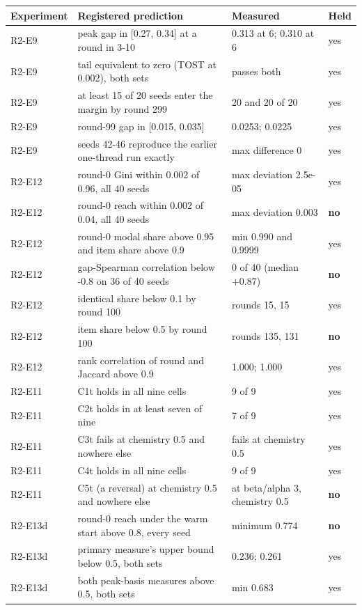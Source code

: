 \footnotesize
\begin{tabular}{lp{6.2cm}p{4.4cm}l}
\hline
Experiment & Registered prediction & Measured & Held \\
\hline
R2-E9 & peak gap in [0.27, 0.34] at a round in 3-10 & 0.313 at 6; 0.310 at 6 & yes \\
R2-E9 & tail equivalent to zero (TOST at 0.002), both sets & passes both & yes \\
R2-E9 & at least 15 of 20 seeds enter the margin by round 299 & 20 and 20 of 20 & yes \\
R2-E9 & round-99 gap in [0.015, 0.035] & 0.0253; 0.0225 & yes \\
R2-E9 & seeds 42-46 reproduce the earlier one-thread run exactly & max difference 0 & yes \\
R2-E12 & round-0 Gini within 0.002 of 0.96, all 40 seeds & max deviation 2.5e-05 & yes \\
R2-E12 & round-0 reach within 0.002 of 0.04, all 40 seeds & max deviation 0.003 & \textbf{no} \\
R2-E12 & round-0 modal share above 0.95 and item share above 0.9 & min 0.990 and 0.9999 & yes \\
R2-E12 & gap-Spearman correlation below -0.8 on 36 of 40 seeds & 0 of 40 (median +0.87) & \textbf{no} \\
R2-E12 & identical share below 0.1 by round 100 & rounds 15, 15 & yes \\
R2-E12 & item share below 0.5 by round 100 & rounds 135, 131 & \textbf{no} \\
R2-E12 & rank correlation of round and Jaccard above 0.9 & 1.000; 1.000 & yes \\
R2-E11 & C1t holds in all nine cells & 9 of 9 & yes \\
R2-E11 & C2t holds in at least seven of nine & 7 of 9 & yes \\
R2-E11 & C3t fails at chemistry 0.5 and nowhere else & fails at chemistry 0.5 & yes \\
R2-E11 & C4t holds in all nine cells & 9 of 9 & yes \\
R2-E11 & C5t (a reversal) at chemistry 0.5 and nowhere else & at beta/alpha 3, chemistry 0.5 & \textbf{no} \\
R2-E13d & round-0 reach under the warm start above 0.8, every seed & minimum 0.774 & \textbf{no} \\
R2-E13d & primary measure's upper bound below 0.5, both sets & 0.236; 0.261 & yes \\
R2-E13d & both peak-basis measures above 0.5, both sets & min 0.683 & yes \\

\end{tabular}

